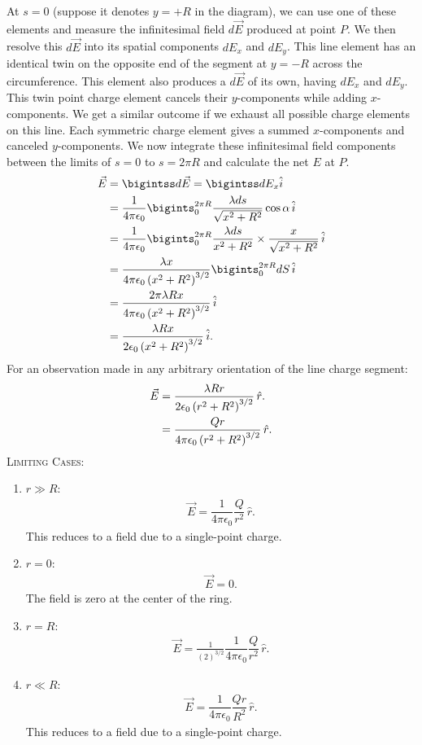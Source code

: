 \documentclass[12pt,b4paper]{article}
\begin{document}
At $s=0$ (suppose it denotes $y=+R$ in the diagram), we can use one of these elements and measure the infinitesimal field $d\vec{E}$ produced at point $P$. We then resolve this $d\vec{E}$ into its spatial components $dE_x$ and $dE_y$. This line element has an identical twin on the opposite end of the segment at $y=-R$ across the circumference. This element also produces a $d\vec{E}$ of its own, having $dE_x$ and $dE_y$. This twin point charge element cancels their $y$-components while adding $x$-components. We get a similar outcome if we exhaust all possible charge elements on this line. Each symmetric charge element gives a summed $x$-components and canceled $y$-components. We now integrate these infinitesimal field components between the limits of $s=0$ to $s=2\pi R$ and calculate the net $E$ at $P$. 
\begin{align}
    \vec{E} &= \bigintss d\vec{E} = \bigintss dE_x \hat{i} \\\notag
    &=\frac{1}{4\pi\epsilon_0}\bigints_{0}^{2\pi R}\frac{\lambda ds}{\sqrt{x^2+R^2}}\cos\alpha\,\hat{i}\notag\\
    &=\frac{1}{4\pi\epsilon_0}\bigints_{0}^{2\pi R}\frac{\lambda ds}{x^2+R^2}\times\frac{x}{\sqrt{x^2+R^2}}\,\hat{i}\notag\\
    &=\frac{\lambda x}{4\pi\epsilon_0\left(x^2 + R^2\right)^{3/2}}\bigints_{0}^{2\pi R}dS\,\hat{i}\notag\\
    &=\frac{2\pi\lambda Rx}{4\pi\epsilon_0\left(x^2 + R^2\right)^{3/2}}\,\hat{i}\notag\\
    &=\frac{\lambda Rx}{2\epsilon_0\left(x^2 + R^2\right)^{3/2}}\,\hat{i}.
\end{align}
For an observation made in any arbitrary orientation of the line charge segment:
\begin{align}
    \vec{E}&=\frac{\lambda Rr}{2\epsilon_0\left(r^2 + R^2\right)^{3/2}}\,\hat{r}.\label{eq:ring-charge-field-def}\notag\\
    &=\frac{Qr}{4\pi\epsilon_0\left(r^2 + R^2\right)^{3/2}}\,\hat{r}.
\end{align}
\textsc{Limiting Cases}: \begin{enumerate}
\itemsep0em 
    \item $r\gg R$: 
    \begin{align}
    \vec{E} = \dfrac{1}{4 \pi \epsilon_0} \dfrac{Q}{r^2}\,\hat{r}.
    \end{align}
    This reduces to a field due to a single-point charge.
    \item $r=0$: 
    \begin{align}
    \vec{E} = 0.
    \end{align}
    The field is zero at the center of the ring.
    \item $r=R$: 
    \begin{align}
    \vec{E} = \frac{1}{\left(2\right)^{3/2}}\dfrac{1}{4 \pi \epsilon_0} \dfrac{Q}{r^2}\,\hat{r}.
    \end{align}
    \item $r\ll R$: 
    \begin{align}
    \vec{E} = \dfrac{1}{4 \pi \epsilon_0} \dfrac{Qr}{R^2}\,\hat{r}.
    \end{align}
    This reduces to a field due to a single-point charge.
\end{enumerate}
\end{document}
